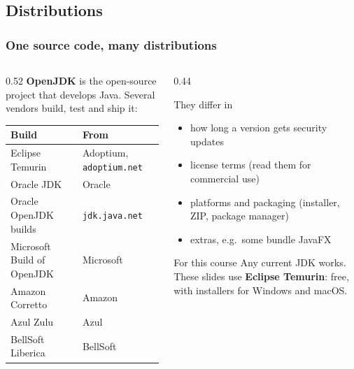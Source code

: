 \documentclass[aspectratio=169,10pt,compress]{beamer}
\begin{document}

\subsection[Distributions]{Distributions}




\begin{frame}[t,fragile] \frametitle{One source code, many distributions}
  \begin{columns}[T]
    \begin{column}{0.52\textwidth}
      \small \textbf{OpenJDK} is the open-source project that develops Java. Several vendors build, test and ship it:
      \vspace{0.3em}

      \footnotesize
      \begin{tabular}{@{}ll@{}}
        \toprule
        \textbf{Build} & \textbf{From} \\
        \midrule
        Eclipse Temurin       & Adoptium, \texttt{adoptium.net} \\
        Oracle JDK            & Oracle \\
        Oracle OpenJDK builds & \texttt{jdk.java.net} \\
        Microsoft Build of OpenJDK & Microsoft \\
        Amazon Corretto       & Amazon \\
        Azul Zulu             & Azul \\
        BellSoft Liberica     & BellSoft \\
        \bottomrule
      \end{tabular}
    \end{column}
    \begin{column}{0.44\textwidth}
      \begin{block}{They differ in}
        \small
        \begin{itemize}
          \item how long a version gets security updates
          \item license terms (read them for commercial use)
          \item platforms and packaging (installer, ZIP, package manager)
          \item extras, e.g.\ some bundle JavaFX
        \end{itemize}
      \end{block}
      \begin{block}{For this course}
        \small Any current JDK works. These slides use \textbf{Eclipse Temurin}: free, with installers for Windows and macOS.
      \end{block}
    \end{column}
  \end{columns}
\end{frame}
\end{document}
